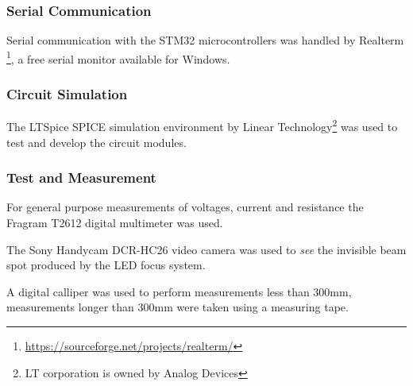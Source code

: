 \subsubsection{Serial Communication}
Serial communication with the STM32 microcontrollers was handled by Realterm \footnote{\url{https://sourceforge.net/projects/realterm/}}, a free serial monitor available for Windows.

\subsubsection{Circuit Simulation}
The LTSpice SPICE simulation environment by Linear Technology\footnote{LT corporation is owned by Analog Devices} was used to test and develop the circuit modules.

\subsubsection{Test and Measurement}
For general purpose measurements of voltages, current and resistance the Fragram T2612 digital multimeter was used.

The Sony Handycam DCR-HC26 video camera was used to \textit{see} the invisible beam spot produced by the LED focus system.

A digital calliper was used to perform measurements less than 300mm, measurements longer than 300mm were taken using a measuring tape.




